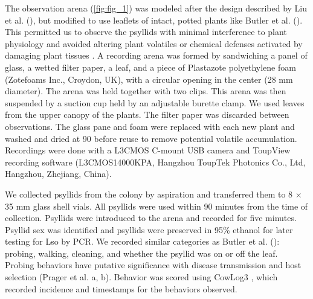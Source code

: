\documentclass{UIdahoMastersThesis}
\begin{document}
The observation arena (\autoref{fig:fig_1}) was modeled after the design described by Liu et al. (\citeyear{Liu2004}), but modified to use leaflets of intact, potted  plants like Butler et al. (\citeyear{Butler2011}). This permitted us to observe the psyllids with minimal interference to plant physiology and avoided altering plant volatiles or chemical defenses activated by damaging plant tissues \autocite{Klingler2005}. A recording arena was formed by sandwiching a panel of glass, a wetted filter paper, a leaf, and a piece of Plastazote\textsuperscript{\textregistered} polyethylene foam (Zotefoams Inc., Croydon, UK), with a circular opening in the center (28 mm diameter). The arena was held together with two clips. This arena was then suspended by a suction cup held by an adjustable burette clamp. We used leaves from the upper canopy of the plants. The filter paper was discarded between observations. The glass pane and foam were replaced with each new plant and washed and dried at 90{\degreeCelsius} before reuse to remove potential volatile accumulation. Recordings were done with a L3CMOS C-mount USB camera and ToupView recording software (L3CMOS14000KPA, Hangzhou ToupTek Photonics Co., Ltd, Hangzhou, Zhejiang, China). 

We collected psyllids from the colony by aspiration and transferred them to 8 $\times$ 35 mm glass shell vials. All psyllids were used within 90 minutes from the time of collection. Psyllids were introduced to the arena and recorded for five minutes. Psyllid sex was identified and psyllids were preserved in 95\% ethanol for later testing for Lso by PCR. We recorded similar categories as Butler et al. (\citeyear{Butler2011}): probing, walking, cleaning, and whether the psyllid was on or off the leaf. Probing behaviors have putative significance with disease transmission and host selection (Prager et al. \citeyear{Prager2014a}a, \citeyear{Prager2014b}b). Behavior was scored using CowLog3 \autocite{Haenninen2009}, which recorded incidence and timestamps for the behaviors observed. 
\end{document}
